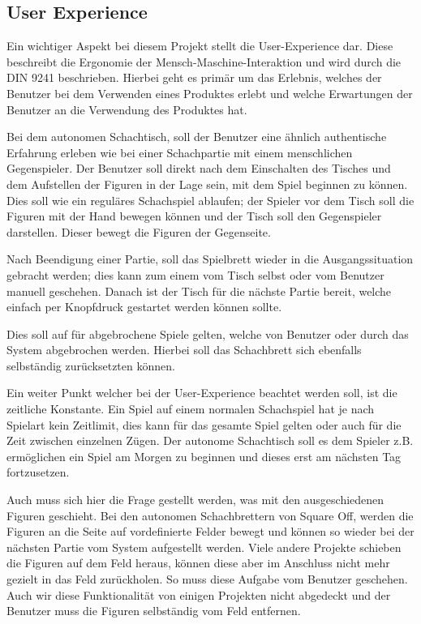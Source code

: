 \hypertarget{user-experience}{%
\subsection{User Experience}\label{user-experience}}

Ein wichtiger Aspekt bei diesem Projekt stellt die User-Experience dar.
Diese beschreibt die Ergonomie der Mensch-Maschine-Interaktion und wird
durch die DIN 9241\cite{din9241} beschrieben. Hierbei geht es primär
um das Erlebnis, welches der Benutzer bei dem Verwenden eines Produktes
erlebt und welche Erwartungen der Benutzer an die Verwendung des
Produktes hat.

Bei dem autonomen Schachtisch, soll der Benutzer eine ähnlich
authentische Erfahrung erleben wie bei einer Schachpartie mit einem
menschlichen Gegenspieler. Der Benutzer soll direkt nach dem Einschalten
des Tisches und dem Aufstellen der Figuren in der Lage sein, mit dem
Spiel beginnen zu können. Dies soll wie ein reguläres Schachspiel
ablaufen; der Spieler vor dem Tisch soll die Figuren mit der Hand
bewegen können und der Tisch soll den Gegenspieler darstellen. Dieser
bewegt die Figuren der Gegenseite.

Nach Beendigung einer Partie, soll das Spielbrett wieder in die
Ausgangssituation gebracht werden; dies kann zum einem vom Tisch selbst
oder vom Benutzer manuell geschehen. Danach ist der Tisch für die
nächste Partie bereit, welche einfach per Knopfdruck gestartet werden
können sollte.

Dies soll auf für abgebrochene Spiele gelten, welche von Benutzer oder
durch das System abgebrochen werden. Hierbei soll das Schachbrett sich
ebenfalls selbständig zurücksetzten können.

Ein weiter Punkt welcher bei der User-Experience beachtet werden soll,
ist die zeitliche Konstante. Ein Spiel auf einem normalen Schachspiel
hat je nach Spielart kein Zeitlimit, dies kann für das gesamte Spiel
gelten oder auch für die Zeit zwischen einzelnen Zügen. Der autonome
Schachtisch soll es dem Spieler z.B. ermöglichen ein Spiel am Morgen zu
beginnen und dieses erst am nächsten Tag fortzusetzen.

Auch muss sich hier die Frage gestellt werden, was mit den
ausgeschiedenen Figuren geschieht. Bei den autonomen Schachbrettern von
Square Off\cite{squareoffgrand}, werden die Figuren an die Seite auf
vordefinierte Felder bewegt und können so wieder bei der nächsten Partie
vom System aufgestellt werden. Viele andere Projekte schieben die
Figuren auf dem Feld heraus, können diese aber im Anschluss nicht mehr
gezielt in das Feld zurückholen. So muss diese Aufgabe vom Benutzer
geschehen. Auch wir diese Funktionalität von einigen Projekten nicht
abgedeckt und der Benutzer muss die Figuren selbständig vom Feld
entfernen.

